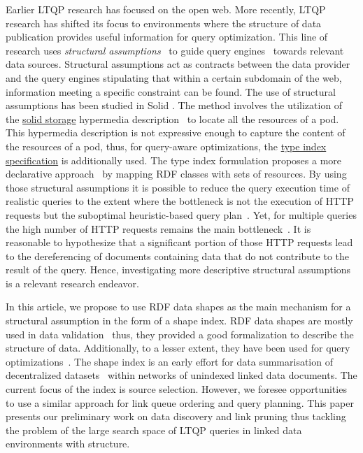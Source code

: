 Earlier LTQP research has focused on the open web.
More recently, LTQP research has shifted its focus to environments where the structure of data publication provides useful information for query optimization.
This line of research uses \emph{structural assumptions}~\cite{Taelman2023} to guide query engines~\cite{verborgh2020guided} towards relevant data sources.
Structural assumptions act as contracts between the data provider and the query engines stipulating that within a certain subdomain of the web, information meeting a specific constraint can be found.
The use of structural assumptions has been studied in Solid \cite{Taelman2023}.
The method involves the utilization of the 
\href{https://solidproject.org/TR/protocol#resources}{solid storage} hypermedia description~\cite{Fielding} to locate all the resources of a pod. 
This hypermedia description is not expressive enough to capture the content of the resources of a pod, thus, for query-aware optimizations, the \href{https://solid.github.io/type-indexes/}{type index specification} is additionally used.
The type index formulation proposes a more declarative approach~\cite{Taelman2017} by mapping RDF classes with sets of resources.
By using those structural assumptions it is possible to reduce the query execution time of realistic queries to the extent where the bottleneck is not the execution of HTTP requests but the suboptimal heuristic-based query plan~\cite{eschauzier_quweda_2023, Taelman2023}.
Yet, for multiple queries the high number of HTTP requests remains the main bottleneck~\cite{eschauzier_quweda_2023}.
It is reasonable to hypothesize that a significant portion of those HTTP requests lead to the dereferencing of documents containing data that do not contribute to the result of the query.
Hence, investigating more descriptive structural assumptions is a relevant research endeavor.

In this article, we propose to use RDF data shapes as the main mechanism for a structural assumption in the form of a shape index.
RDF data shapes are mostly used in data validation~\cite{Gayo2018a} thus, they provided a good formalization to describe the structure of data.
Additionally, to a lesser extent, they have been used for query optimizations~\cite{kashif2021}.
The shape index is an early effort for data summarisation of decentralized datasets~\cite{Stuckenschmidt2004,Goldman1997, Harth2010} within networks of unindexed linked data documents.
The current focus of the index is source selection.
However, we foresee opportunities to use a similar approach for link queue ordering and query planning.
This paper presents our preliminary work on data discovery and link pruning thus tackling the problem of the large search space of LTQP queries in linked data environments with structure.
